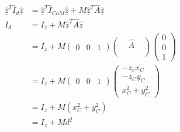 \documentclass[a4paper,11pt,normalem]{article}
\begin{document}
\begin{example}[1]
\[
    \begin{aligned}
    \underline{\hat{z}}^T \hat{I}_{d} \underline{\hat{z}} &= \underline{\hat{z}}^T \hat{I}_{CoM} \underline{\hat{z}} + M\underline{\hat{z}}^T \hat{A} \underline{\hat{z}} \\
    I_d &= I_z + M\underline{\hat{z}}^T \hat{A} \underline{\hat{z}} \\
    &= I_z + M \begin{pmatrix} 0 & 0 & 1 \end{pmatrix}\begin{pmatrix} & \hat{A} & \\ & & \\ \end{pmatrix}\begin{pmatrix} 0 \\ 0 \\ 1 \end{pmatrix} \\
    &= I_z + M \begin{pmatrix} 0 & 0 & 1 \end{pmatrix}\begin{pmatrix} -z_cx_C \\ -z_Cy_C \\ x_C^2 + y_C^2 \end{pmatrix} \\
    &= I_z + M(x_C^2 + y_C^2) \\
    &= I_z + Md^2
    \end{aligned}
\]
\end{example}
\end{document}
